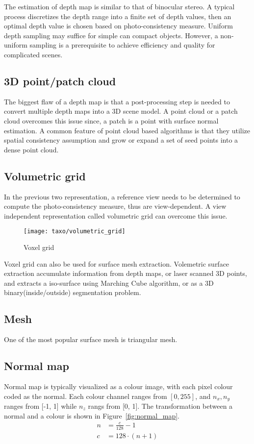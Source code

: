 The estimation of depth map is similar to that of binocular stereo. A typical process discretizes the depth range into a finite set of depth values, then an optimal depth value is chosen based on photo-consistency measure. Uniform depth sampling may suffice for simple can compact objects. However, a non-uniform sampling is a prerequisite to achieve efficiency and quality for complicated scenes.

\subsection{3D point/patch cloud}
The biggest flaw of a depth map is that a post-processing step is needed to convert multiple depth maps into a 3D scene model. A point cloud or a patch cloud overcomes this issue since, a patch is a point with surface normal estimation. A common feature of point cloud based algorithms is that they utilize spatial consistency assumption and grow or expand a set of seed points into a dense point cloud.

\subsection{Volumetric grid}
In the previous two representation, a reference view needs to be determined to compute the photo-consistency measure, thus are view-dependent. A view independent representation called volumetric grid can overcome this issue.
\begin{figure}[h]
\centering
\texttt{[image: taxo/volumetric\_grid]}
\caption{Voxel grid}
\end{figure}
Voxel grid can also be used for surface mesh extraction. Volemetric surface extraction accumulate information from depth maps, or laser scanned 3D points, and extracts a iso-surface using Marching Cube algorithm, or as a 3D binary(inside/outside) segmentation problem.

\subsection{Mesh}
One of the most popular surface mesh is triangular mesh.

\subsection{Normal map}
Normal map is typically visualized as a colour image, with each pixel colour coded as the normal. Each colour channel ranges from $[0, 255]$, and $n_x, n_y$ ranges from [-1, 1] while $n_z$ rangs from [0, 1]. The transformation between a normal and a colour is shown in Figure~\ref{fig:normal_map}.
\begin{align*}
n &= \frac{c}{128}-1\\
c &= 128\cdot(n+1)
\end{align*}

